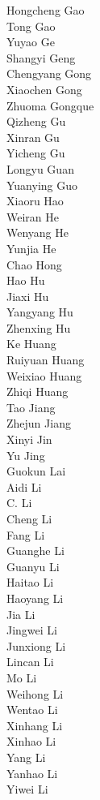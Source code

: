 Hongcheng Gao\\
Tong Gao\\
Yuyao Ge\\
Shangyi Geng\\
Chengyang Gong\\
Xiaochen Gong\\
Zhuoma Gongque\\
Qizheng Gu\\
Xinran Gu\\
Yicheng Gu\\
Longyu Guan\\
Yuanying Guo\\
Xiaoru Hao\\
Weiran He\\
Wenyang He\\
Yunjia He\\
Chao Hong\\
Hao Hu\\
Jiaxi Hu\\
Yangyang Hu\\
Zhenxing Hu\\
Ke Huang\\
Ruiyuan Huang\\
Weixiao Huang\\
Zhiqi Huang\\
Tao Jiang\\
Zhejun Jiang\\
Xinyi Jin\\
Yu Jing\\
Guokun Lai\\
Aidi Li\\
C. Li\\
Cheng Li\\
Fang Li\\
Guanghe Li\\
Guanyu Li\\
Haitao Li\\
Haoyang Li\\
Jia Li\\
Jingwei Li\\
Junxiong Li\\
Lincan Li\\
Mo Li\\
Weihong Li\\
Wentao Li\\
Xinhang Li\\
Xinhao Li\\
Yang Li\\
Yanhao Li\\
Yiwei Li\\
